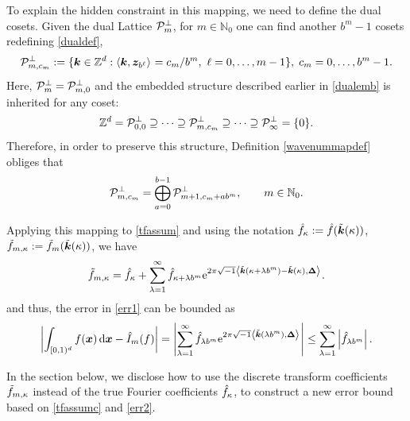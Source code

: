 \documentclass[graybox]{svmult}
\newcommand{\Z}{\mathbb{Z}} %
\newcommand{\N}{\mathbb{N}} %
\newcommand{\bsx}{\boldsymbol{x}}    %
\newcommand{\bsz}{\boldsymbol{z}}    %
\newcommand{\bsDelta}{\boldsymbol{\Delta}}    %
\begin{document}
To explain the hidden constraint in this mapping, we need to define the dual cosets. Given the dual Lattice $\mathcal{P}_{m}^{\perp}$, for $m\in\N_0$ one can find another $b^m-1$ cosets redefining \eqref{dualdef},
\begin{align}
\cp_{m,c_m}^\perp:=\{\bsk \in \Z^d : \ip{\bsk}{\bsz_{b^{\ell}}} = c_m/b^m, \ \ell=0, \ldots, m-1\}, \; c_m=0, \ldots, b^m-1.\label{dualdefcoset}
\end{align}
Here, $\mathcal{P}_{m}^{\perp}=\mathcal{P}_{m,0}^\perp$ and the embedded structure described earlier in \eqref{dualemb} is inherited for any coset:
\begin{equation}\label{dualemb}
\Z^d=\cp^{\perp}_{0,0}\supseteq\dots\supseteq\cp^{\perp}_{m,c_m}\supseteq\dots\supseteq\cp^{\perp}_{\infty}=\{0\}.
\end{equation}
Therefore, in order to preserve this structure, Definition \ref{wavenummapdef} obliges that
\begin{equation}
\cp^{\perp}_{m,c_m}=\bigoplus_{a=0}^{b-1}\cp^{\perp}_{m+1,c_m+ab^m}, \qquad m\in\N_0.
\end{equation}

Applying this mapping to \eqref{tfassum} and using the notation $\hat{f}_{\kappa} :=\hat{f}(\tilde{\boldsymbol{k}}(\kappa))$, $\tilde{f}_{m,\kappa} := \tilde{f}_m(\tilde{\boldsymbol{k}}(\kappa))$, we have
\begin{equation}
\tf_{m,\kappa} = \hf_{\kappa} + \sum_{\lambda=1}^{\infty} \hf_{\kappa+\lambda b^{m}} \E^{2 \pi \sqrt{-1} \ip{\tvk(\kappa+\lambda b^{m}) - \tvk(\kappa)}{\bsDelta}}.
\label{tfassumc}
\end{equation}
and thus, the error in \eqref{err1} can be bounded as
\begin{equation}
\biggabs{ \int_{\cube} f(\bsx) \, \D \bsx - \hI_m(f)} 
= \Biggabs {\sum_{\lambda=1}^{\infty} \hf_{\lambda b^m} \E^{2 \pi \sqrt{-1} \ip{\tvk(\lambda b^m)}{\bsDelta}}}
\le \sum_{\lambda=1}^{\infty} \left \lvert \hf_{\lambda b^m}\right \rvert. \label{err2}
\end{equation}

In the section below, we disclose how to use the discrete transform coefficients $\tilde{f}_{m,\kappa}$ instead of the true Fourier coefficients $\hat{f}_{\kappa}$, to construct a new error bound based on \eqref{tfassumc} and \eqref{err2}.
\end{document}
